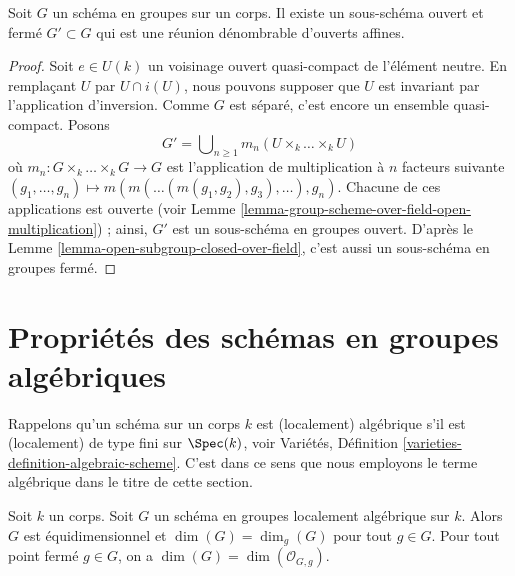 \begin{lemma}
\label{lemma-group-scheme-field-countable-affine}
Soit $G$ un schéma en groupes sur un corps.
Il existe un sous-schéma ouvert et fermé $G' \subset G$
qui est une réunion dénombrable d'ouverts affines.
\end{lemma}

\begin{proof}
Soit $e \in U(k)$ un voisinage ouvert quasi-compact de l'élément
neutre. En remplaçant $U$ par $U \cap i(U)$, nous pouvons supposer que
$U$ est invariant par l'application d'inversion. Comme $G$ est séparé, c'est
encore un ensemble quasi-compact. Posons
$$
G' = \bigcup\nolimits_{n \geq 1} m_n(U \times_k \ldots \times_k U)
$$
où $m_n : G \times_k \ldots \times_k G \to G$ est l'application de multiplication à $n$ facteurs
suivante
$(g_1, \ldots, g_n) \mapsto m(m(\ldots (m(g_1, g_2), g_3), \ldots ), g_n)$.
Chacune de ces applications est ouverte (voir
Lemme \ref{lemma-group-scheme-over-field-open-multiplication}) ;
ainsi, $G'$ est un sous-schéma en groupes ouvert. D'après le
Lemme \ref{lemma-open-subgroup-closed-over-field},
c'est aussi un sous-schéma en groupes fermé.
\end{proof}






\section{Propriétés des schémas en groupes algébriques}
\label{section-algebraic-group-schemes}

\noindent
Rappelons qu'un schéma sur un corps $k$ est (localement) algébrique s'il est
(localement) de type fini sur $\Spec(k)$, voir
Variétés, Définition \ref{varieties-definition-algebraic-scheme}.
C'est dans ce sens que nous employons le terme algébrique dans le titre de cette section.

\begin{lemma}
\label{lemma-group-scheme-finite-type-field}
Soit $k$ un corps. Soit $G$ un schéma en groupes localement algébrique sur $k$.
Alors $G$ est équidimensionnel et $\dim(G) = \dim_g(G)$ pour tout $g \in G$.
Pour tout point fermé $g \in G$, on a $\dim(G) = \dim(\mathcal{O}_{G, g})$.
\end{lemma}

